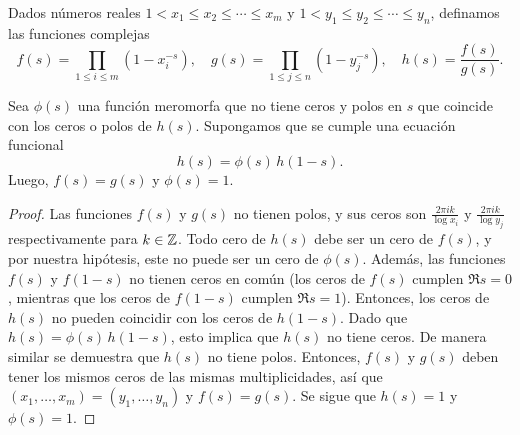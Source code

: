 \begin{lema}
  Dados números reales $1 < x_1 \le x_2 \le \cdots \le x_m$ y
  $1 < y_1 \le y_2 \le \cdots \le y_n$, definamos las funciones complejas
  \[ f (s) = \prod_{1\le i\le m} (1 - x_i^{-s}), \quad
    g (s) = \prod_{1\le j\le n} (1 - y_j^{-s}), \quad
    h (s) = \frac{f (s)}{g (s)}. \]

  Sea $\phi (s)$ una función meromorfa que no tiene ceros y polos en $s$ que
  coincide con los ceros o polos de $h (s)$. Supongamos que se cumple una
  ecuación funcional
  $$h (s) = \phi (s) \, h (1-s).$$
  Luego, $f (s) = g (s)$ y $\phi (s) = 1$.

  \begin{proof}
    Las funciones $f (s)$ y $g (s)$ no tienen polos, y sus ceros son
    $\frac{2\pi i k}{\log x_i}$ y $\frac{2\pi i k}{\log y_j}$ respectivamente
    para $k\in \mathbb{Z}$. Todo cero de $h (s)$ debe ser un cero de $f (s)$, y por
    nuestra hipótesis, este no puede ser un cero de $\phi (s)$. Además, las
    funciones $f (s)$ y $f (1-s)$ no tienen ceros en común (los ceros de $f (s)$
    cumplen $\Re s = 0$, mientras que los ceros de $f (1-s)$ cumplen
    $\Re s = 1$). Entonces, los ceros de $h (s)$ no pueden coincidir con los
    ceros de $h (1-s)$. Dado que $h (s) = \phi (s) \, h (1-s)$, esto implica que
    $h (s)$ no tiene ceros. De manera similar se demuestra que $h (s)$ no tiene
    polos. Entonces, $f (s)$ y $g (s)$ deben tener los mismos ceros de las
    mismas multiplicidades, así que $(x_1,\ldots,x_m) = (y_1,\ldots,y_n)$ y
    $f (s) = g (s)$. Se sigue que $h (s) = 1$ y $\phi (s) = 1$.
  \end{proof}
\end{lema}

